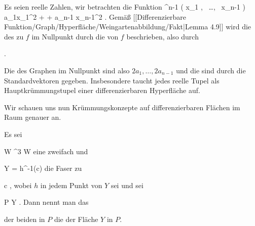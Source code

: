 {

Es seien
 reelle Zahlen, wir betrachten die Funktion
 {\R^{n-1}} {\R
} { \left(  x_1   , \,   \ldots  , \,   x_{n-1}                 \right) } { a_1x_1^2  + \cdots + a_{n-1} x_{n-1}^2
} {.}
Gemäß
[[Differenzierbare Funktion/Graph/Hyperfläche/Weingartenabbildung/Fakt|Lemma 4.9]]
wird die
des
zu $f$ im Nullpunkt durch die
von $f$ beschrieben, also durch

 { . }

Die
des Graphen im Nullpunkt sind also $2a_1  , \ldots , 2a_{n-1}$ und die
sind durch die Standardvektoren gegeben. Insbesondere taucht jedes reelle Tupel als Hauptkrümmungstupel einer differenzierbaren Hyperfläche auf.

}


Wir schauen uns nun Krümmungskonzepte auf differenzierbaren Flächen im Raum genauer an.

{}
{

Es sei

\mavergleichskette
{\vergleichskette
{ W
}
{ \subseteq }{ \R^3
}
{  }{
}
{    }{
}
{   }{
}
}
{}{}{}
 { W } { \R
} {}
eine zweifach
und

\mavergleichskette
{\vergleichskette
{ Y
}
{ = }{ h^{-1}(c)
}
{  }{
}
{    }{
}
{   }{
}
}
{}{}{}
die Faser zu

\mavergleichskette
{\vergleichskette
{ c
}
{ \in }{ \R
}
{  }{
}
{    }{
}
{   }{
}
}
{}{}{,}
wobei $h$ in jedem Punkt von $Y$
sei und sei

\mavergleichskette
{\vergleichskette
{ P
}
{ \in }{ Y
}
{  }{
}
{    }{
}
{   }{
}
}
{}{}{.}
Dann nennt man das

  der beiden
in $P$ die
der Fläche $Y$ in $P$.

}

